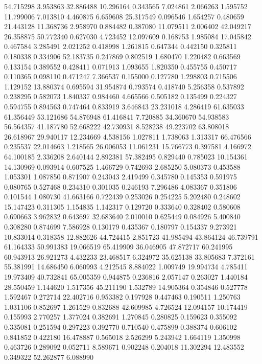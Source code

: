54.715298
3.953863
32.886488
10.296164
0.343565
7.024861
2.066263
1.595752
11.799006
7.013810
4.460875
6.659608
25.317549
0.096546
1.654257
0.480659
21.443128
11.368736
2.958970
0.884482
0.387080
11.079511
2.006402
42.049217
26.358875
50.772340
0.627030
4.723452
12.097609
0.168753
1.985084
17.045842
0.467584
3.285491
2.021252
0.418998
1.261815
0.647344
0.442150
0.325811
0.180338
0.334906
52.183735
0.247869
0.802519
1.680470
1.220482
0.663569
0.133154
0.389552
0.428411
0.071913
1.093655
1.820350
0.455755
0.450717
0.110365
0.098110
0.471247
7.366537
0.155000
0.127780
1.298803
0.715506
1.129152
13.880374
0.695594
31.954874
0.793574
0.418740
5.256358
0.537892
0.238295
0.582073
1.840337
0.984460
4.665566
0.505182
0.135499
0.224327
0.594755
0.894563
0.747464
0.833919
3.646843
23.231018
4.286419
61.635033
61.356449
53.121686
54.876948
61.416841
7.720885
34.360670
54.938583
56.564357
41.187780
52.668222
42.730931
8.528238
49.223702
63.808018
26.618967
29.940117
12.234669
4.538156
1.027811
1.738063
1.313317
66.476566
0.235537
22.014663
1.218565
26.006053
11.061231
15.766773
0.397581
4.166972
64.100185
2.336208
2.640144
2.892381
57.382495
0.829440
0.785023
10.154361
14.130969
0.093914
0.607525
1.466729
0.742693
2.685250
5.080373
0.453588
1.053301
1.087850
0.871907
0.243043
2.419499
0.345780
0.145353
0.591975
0.080765
0.527468
0.234310
0.301035
0.246193
7.296486
4.083367
0.351806
0.101544
1.080730
41.663166
0.722439
0.253026
0.254225
5.202480
0.248602
15.147423
0.311305
1.154835
1.142317
0.129720
0.333640
0.328402
0.580608
0.690663
3.962832
0.643697
32.683640
2.010010
0.625449
0.084926
5.400840
0.308280
0.874699
7.586928
0.130179
0.435367
0.180797
0.154337
9.273921
10.833014
0.318358
12.882626
44.724415
2.851723
41.985494
43.864124
46.739791
61.164333
50.991383
19.066519
65.419909
36.046905
47.872717
60.241995
60.943913
26.921273
4.432233
23.468517
6.324972
35.625138
33.805683
7.372161
55.381991
14.686450
6.060993
4.212545
8.884022
1.009749
19.994734
4.785411
19.973409
40.732841
65.005359
0.944875
0.236816
2.057147
0.263027
1.440184
28.550459
1.144620
1.517356
45.211190
1.532789
14.905364
0.354846
0.527778
1.592467
0.272714
22.402716
0.953382
0.197928
0.447463
0.190511
1.250763
1.031106
0.852697
1.261529
0.832688
42.609985
4.726524
12.094157
10.174419
0.155993
2.770257
1.377024
0.382691
1.270845
0.280825
0.159623
0.355092
0.335081
0.251594
0.297223
0.392770
0.710540
0.475899
0.388374
0.606102
0.841852
0.422180
16.478887
0.565018
2.526299
5.243942
1.664119
1.350998
0.463726
0.289092
0.052711
8.589671
0.902248
0.204018
11.302294
12.483552
0.349322
52.262877
6.088990
